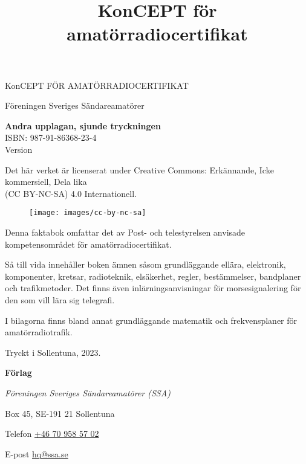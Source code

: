 \onecolumn{}
\vspace{10em}
\title{KonCEPT för amatörradiocertifikat}
\begin{center}
\Large{KonCEPT FÖR AMATÖRRADIOCERTIFIKAT}

Föreningen Sveriges Sändareamatörer\\[2\baselineskip]
\end{center}

\noindent \textbf{Andra upplagan, sjunde tryckningen}\\
\noindent ISBN: 987-91-86368-23-4\\
\noindent Version \revision
\bigskip

\noindent Det här verket är licenserat under Creative Commons:\newline
\noindent Erkännande, Icke kommersiell, Dela lika\\
\noindent (CC BY-NC-SA) 4.0 Internationell.
\begin{figure}[h]
    \texttt{[image: images/cc-by-nc-sa]}
\end{figure}

\vfill

\noindent Denna faktabok omfattar det av Post- och tele\-styrel\-sen anvisade
kompetensområdet för amatörradiocertifikat.

\bigskip

\noindent Så till vida innehåller boken ämnen såsom grundläggande ellära, elektronik, komponenter,
kretsar, radioteknik, elsäkerhet, regler, bestämmelser, bandplaner och tra\-fik\-metoder.
Det finns även inlärningsanvisningar för morsesignalering för den
som vill lära sig telegrafi.

\bigskip

\noindent I bilagorna finns bland annat grundläggande matematik
och frekvensplaner för ama\-törradiotrafik. 

\vfill

\noindent Tryckt i Sollentuna, 2023.

\bigskip

\noindent \textbf{Förlag}

\smallskip

\noindent\textit{Föreningen Sveriges Sändareamatörer (SSA)}

\smallskip\noindent Box 45, SE-191 21 Sollentuna

\smallskip

\noindent Telefon \href{tel:+46709585702}{+46 70 958 57 02}


\smallskip\noindent E-post \href{mailto:hq@ssa.se}{hq@ssa.se}


\restoregeometry\twocolumn
{}
